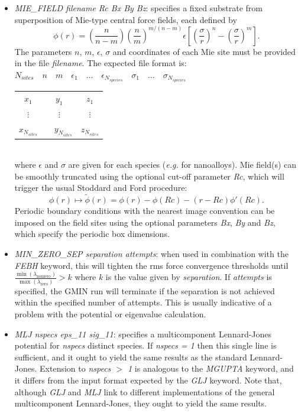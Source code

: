 \documentclass[12pt,a4paper,dvips]{article}
\begin{document}
\begin{itemize}
\item {\it MIE\_FIELD filename Rc Bx By Bz\/}: specifies a fixed substrate from superposition of Mie-type central force fields, each defined by
\begin{displaymath}
\phi(r) = \left(\frac{n}{n-m}\right) \left(\frac{n}{m}\right)^{m/(n-m)} \epsilon \left[ \left(\frac{\sigma}{r}\right)^{n} - \left(\frac{\sigma}{r}\right)^{m}\right].
\end{displaymath}
The parameters $n$, $m$, $\epsilon$, $\sigma$ and coordinates of each Mie site must be provided in the file {\it filename}. The expected file format is: \\
$ N_{sites} \quad n \quad m \quad \epsilon_{1} \quad \dots \quad \epsilon_{N_{species}} \quad \sigma_{1} \quad \dots \quad \sigma_{N_{species}}$ \\ 
\begin{tabular}{ccc}
$x_{1}$ & $y_{1}$ & $z_{1}$ \\
$\vdots$ & $\vdots$ & $\vdots$ \\
$x_{N_{sites}}$ & $\quad y_{N_{sites}}$ & $z_{N_{sites}}$
\end{tabular} \\
where $\epsilon$ and $\sigma$ are given for each species (\emph{e.g.} for nanoalloys). Mie field(s) can be smoothly truncated using the optional cut-off parameter \emph{Rc}, which will trigger the usual Stoddard and Ford procedure:
\begin{displaymath}
\phi(r) \mapsto \tilde{\phi}(r) = \phi(r) - \phi(Rc) - (r-Rc)\phi'(Rc).
\end{displaymath}
Periodic boundary conditions with the nearest image convention can be imposed on the field sites using the optional parameters \emph{Bx}, \emph{By} and \emph{Bz}, which specify the periodic box dimensions.

\item {\it MIN\_ZERO\_SEP separation attempts\/}: when used in combination with the {\it FEBH\/} keyword, this will tighten the rms force convergence thresholds until $\frac{\min(\lambda_\text{nonzero})}{\max(\lambda_\text{zero})} > k$ where $k$ is the value given by {\it separation\/}. If {\it attempts\/} is specified, the GMIN run will
terminate if the separation is not achieved within the specified number of attempts. This is usually indicative of a problem with the potential or eigenvalue calculation.

\item {\it MLJ nspecs eps\_11 sig\_11\/}: specifies a multicomponent Lennard-Jones potential for {\it nspecs} distinct species. If {\it nspecs = 1\/} then this single line is sufficient, and it ought to yield the same results as the standard Lennard-Jones. Extension to {\it nspecs $>$ 1\/} is analogous to the {\it MGUPTA\/} keyword, and it differs from the input format expected by the {\it GLJ\/} keyword. Note that, although {\it GLJ\/} and {\it MLJ\/} link to different implementations of the general multicomponent Lennard-Jones, they ought to yield the same results.


\end{itemize}
\end{document}
